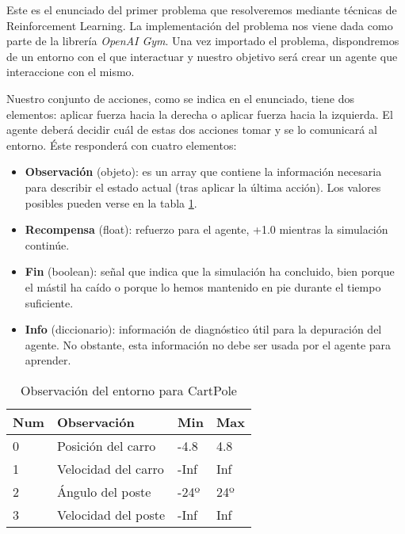Este es el enunciado del primer problema que resolveremos mediante técnicas de Reinforcement Learning. La implementación del problema nos viene dada como parte de la librería \textit{OpenAI Gym}. Una vez importado el problema, dispondremos de un entorno con el que interactuar y nuestro objetivo será crear un agente que interaccione con el mismo.

Nuestro conjunto de acciones, como se indica en el enunciado, tiene dos elementos: aplicar fuerza hacia la derecha o aplicar fuerza hacia la izquierda. El agente deberá decidir cuál de estas dos acciones tomar y se lo comunicará al entorno. Éste responderá con cuatro elementos:

\begin{itemize}
    \item \textbf{Observación} (objeto): es un array que contiene la información necesaria para describir el estado actual (tras aplicar la última acción). Los valores posibles pueden verse en la tabla \ref{obs-cartpole}.
    \item \textbf{Recompensa} (float): refuerzo para el agente, +1.0 mientras la simulación continúe.
    \item \textbf{Fin} (boolean): señal que indica que la simulación ha concluido, bien porque el mástil ha caído o porque lo hemos mantenido en pie durante el tiempo suficiente.
    \item \textbf{Info} (diccionario): información de diagnóstico útil para la depuración del agente. No obstante, esta información no debe ser usada por el agente para aprender.
\end{itemize}
\begin{table}[]
    \centering
    \begin{tabular}{|l|l|l|l|}
    \hline
    \textbf{Num} & \textbf{Observación} & \textbf{Min} & \textbf{Max} \\ \hline
    0            & Posición del carro   & -4.8         & 4.8          \\ \hline
    1            & Velocidad del carro  & -Inf         & Inf          \\ \hline
    2            & Ángulo del poste     & -24º         & 24º          \\ \hline
    3            & Velocidad del poste  & -Inf         & Inf          \\ \hline
    \end{tabular}
    \caption{Observación del entorno para CartPole}
    \label{obs-cartpole}
\end{table}

